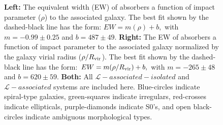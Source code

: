 \documentclass[twocolumn,tighten]{aastex62}
\begin{document}
\begin{figure}[ht!]
        \centering
        \vspace{0pt}
        \caption{\small{\textbf{Left: } The equivalent width (EW) of absorbers a function of impact parameter ($\rho$) to the associated galaxy. The best fit shown by the dashed-black line has the form: $EW = m (\rho) + b,$ with $m = -0.99 \pm 0.25$ and $b = 487 \pm 49$. \textbf{Right:} The EW of absorbers a function of impact parameter to the associated galaxy normalized by the galaxy virial radius ($\rho / R_{\rm vir}$). The best fit shown by the dashed-black line has the form: $EW = m (\rho / R_{\rm vir}) + b,$ with $m = -265 \pm 48$ and $b = 620 \pm 59$. \textbf{Both:} All $\mathcal{L}-associated-isolated$ and $\mathcal{L}-associated$ systems are included here. Blue-circles indicate spiral-type galaxies, green-squares indicate irregulars, red-crosses indicate ellipticals, purple-diamonds indicate S0's, and open black-circles indicate ambiguous morphological types. }}
        \vspace{5pt}
        \label{ew_both}
\end{figure}
\end{document}
